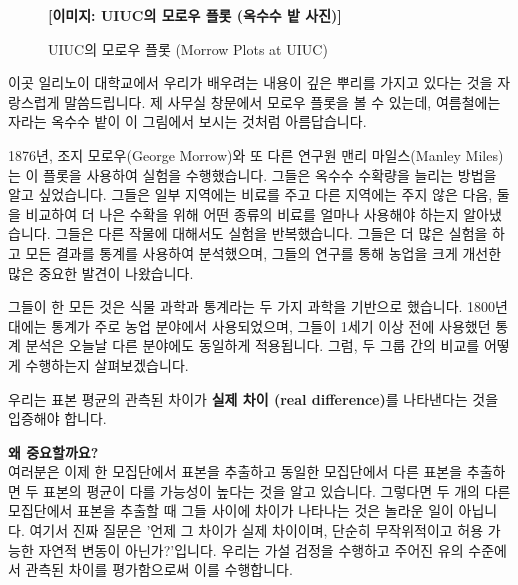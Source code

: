 \documentclass[11pt,a4paper]{article}
\theoremstyle{definition}
\begin{document}
\begin{figure}[h!]
    \centering
    \textbf{[이미지: UIUC의 모로우 플롯 (옥수수 밭 사진)]}
    \caption{UIUC의 모로우 플롯 (Morrow Plots at UIUC)}
    \label{fig:morrow_plots}
\end{figure}
\begin{infobox}[title=모로우 플롯: 1세기의 학습과 통계의 뿌리]
이곳 일리노이 대학교에서 우리가 배우려는 내용이 깊은 뿌리를 가지고 있다는 것을 자랑스럽게 말씀드립니다. 제 사무실 창문에서 모로우 플롯을 볼 수 있는데, 여름철에는 자라는 옥수수 밭이 이 그림에서 보시는 것처럼 아름답습니다.

1876년, 조지 모로우(George Morrow)와 또 다른 연구원 맨리 마일스(Manley Miles)는 이 플롯을 사용하여 실험을 수행했습니다. 그들은 옥수수 수확량을 늘리는 방법을 알고 싶었습니다. 그들은 일부 지역에는 비료를 주고 다른 지역에는 주지 않은 다음, 둘을 비교하여 더 나은 수확을 위해 어떤 종류의 비료를 얼마나 사용해야 하는지 알아냈습니다. 그들은 다른 작물에 대해서도 실험을 반복했습니다. 그들은 더 많은 실험을 하고 모든 결과를 통계를 사용하여 분석했으며, 그들의 연구를 통해 농업을 크게 개선한 많은 중요한 발견이 나왔습니다.

그들이 한 모든 것은 식물 과학과 통계라는 두 가지 과학을 기반으로 했습니다. 1800년대에는 통계가 주로 농업 분야에서 사용되었으며, 그들이 1세기 이상 전에 사용했던 통계 분석은 오늘날 다른 분야에도 동일하게 적용됩니다. 그럼, 두 그룹 간의 비교를 어떻게 수행하는지 살펴보겠습니다.
\end{infobox}

\begin{infobox}[title=평가 방법: '실제 차이'의 중요성]
우리는 표본 평균의 관측된 차이가 \textbf{실제 차이 (real difference)}를 나타낸다는 것을 입증해야 합니다.

\textbf{왜 중요할까요?} \\
여러분은 이제 한 모집단에서 표본을 추출하고 동일한 모집단에서 다른 표본을 추출하면 두 표본의 평균이 다를 가능성이 높다는 것을 알고 있습니다. 그렇다면 두 개의 다른 모집단에서 표본을 추출할 때 그들 사이에 차이가 나타나는 것은 놀라운 일이 아닙니다. 여기서 진짜 질문은 '언제 그 차이가 실제 차이이며, 단순히 무작위적이고 허용 가능한 자연적 변동이 아닌가?'입니다. 우리는 가설 검정을 수행하고 주어진 유의 수준에서 관측된 차이를 평가함으로써 이를 수행합니다.
\end{infobox}
\end{document}
